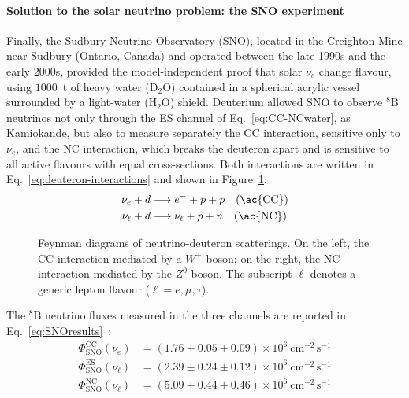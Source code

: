 \paragraph{Solution to the solar neutrino problem: the SNO experiment}
Finally, the Sudbury Neutrino Observatory (SNO), located in the Creighton Mine near Sudbury (Ontario, Canada) and operated between the late 1990s and the early 2000s, provided the model-independent proof that solar $\nu_e$ change flavour, using $1000$~t of heavy water ($\text{D}_2\text{O}$) contained in a spherical acrylic vessel surrounded by a light-water ($\text{H}_2\text{O}$) shield. Deuterium allowed SNO to observe ${}^8\text{B}$ neutrinos not only through the \ac{ES} channel of Eq.~\ref{eq:CC-NCwater}, as Kamiokande, but also to measure separately the \ac{CC} interaction, sensitive only to $\nu_e$, and the \ac{NC} interaction, which breaks the deuteron apart and is sensitive to all active flavours with equal cross-sections. Both interactions are written in Eq.~\ref{eq:deuteron-interactions} and shown in Figure~\ref{fig:feynman-deuteron}.
\begin{equation}
    \label{eq:deuteron-interactions}
    \begin{aligned}
        \nu_e + d &\longrightarrow e^- + p + p \quad (\text{\ac{CC}})\\
        \nu_\ell + d &\longrightarrow \nu_\ell + p + n \quad (\text{\ac{NC}})
    \end{aligned}
\end{equation}
\begin{figure}[H]
    \centering
    \resizebox{0.7\textwidth}{!}{
        
    }
    \caption{Feynman diagrams of neutrino-deuteron scatterings. On the left, the \ac{CC} interaction mediated by a $W^+$ boson; on the right, the \ac{NC} 
    interaction mediated by the $Z^0$ boson. The subscript $\ell$ denotes a generic lepton flavour ($\ell = e, \mu, \tau$).}
    \label{fig:feynman-deuteron}
\end{figure}
The ${}^{8}\text{B}$ neutrino fluxes measured in the three channels are reported in Eq.~\ref{eq:SNOresults}~\cite{SNO2002-results}:
\begin{equation}
    \label{eq:SNOresults}
    \begin{aligned}
        \Phi_\text{SNO}^\text{CC}(\nu_e) &= (1.76 \pm 0.05 \pm 0.09) \times 10^{6}~\text{cm}^{-2}\,\text{s}^{-1} \\
        \Phi_\text{SNO}^\text{ES}(\nu_\ell) &= (2.39 \pm 0.24 \pm 0.12) \times 10^{6}~\text{cm}^{-2}\,\text{s}^{-1} \\
        \Phi_\text{SNO}^\text{NC}(\nu_\ell) &= (5.09 \pm 0.44 \pm 0.46) \times 10^{6}~\text{cm}^{-2}\,\text{s}^{-1}
    \end{aligned}
\end{equation} 
